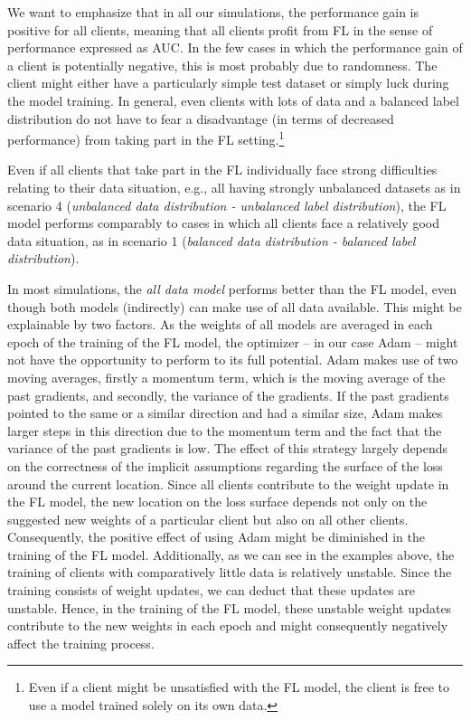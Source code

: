We want to emphasize that in all our simulations, the performance gain is positive for all clients, meaning that all clients profit from FL in the sense of performance expressed as AUC. In the few cases in which the performance gain of a client is potentially negative, this is most probably due to randomness. The client might either have a particularly simple test dataset or simply luck during the model training. In general, even clients with lots of data and a balanced label distribution do not have to fear a disadvantage (in terms of decreased performance) from taking part in the FL setting.\footnote{Even if a client might be unsatisfied with the FL model, the client is free to use a model trained solely on its own data.}

Even if all clients that take part in the FL individually face strong difficulties relating to their data situation, e.g., all having strongly unbalanced datasets as in scenario 4 (\emph{unbalanced data distribution - unbalanced label distribution}), the FL model performs comparably to cases in which all clients face a relatively good data situation, as in scenario 1 (\emph{balanced data distribution - balanced label distribution}).

In most simulations, the \emph{all data model} performs better than the FL model, even though both models (indirectly) can make use of all data available. This might be explainable by two factors. As the weights of all models are averaged in each epoch of the training of the FL model, the optimizer -- in our case Adam -- might not have the opportunity to perform to its full potential. Adam makes use of two moving averages, firstly a momentum term, which is the moving average of the past gradients, and secondly, the variance of the gradients. If the past gradients pointed to the same or a similar direction and had a similar size, Adam makes larger steps in this direction due to the momentum term and the fact that the variance of the past gradients is low. The effect of this strategy largely depends on the correctness of the implicit assumptions regarding the surface of the loss around the current location. Since all clients contribute to the weight update in the FL model, the new location on the loss surface depends not only on the suggested new weights of a particular client but also on all other clients. Consequently, the positive effect of using Adam might be diminished in the training of the FL model. Additionally, as we can see in the examples above, the training of clients with comparatively little data is relatively unstable. Since the training consists of weight updates, we can deduct that these updates are unstable. Hence, in the training of the FL model, these unstable weight updates contribute to the new weights in each epoch and might consequently negatively affect the training process.

